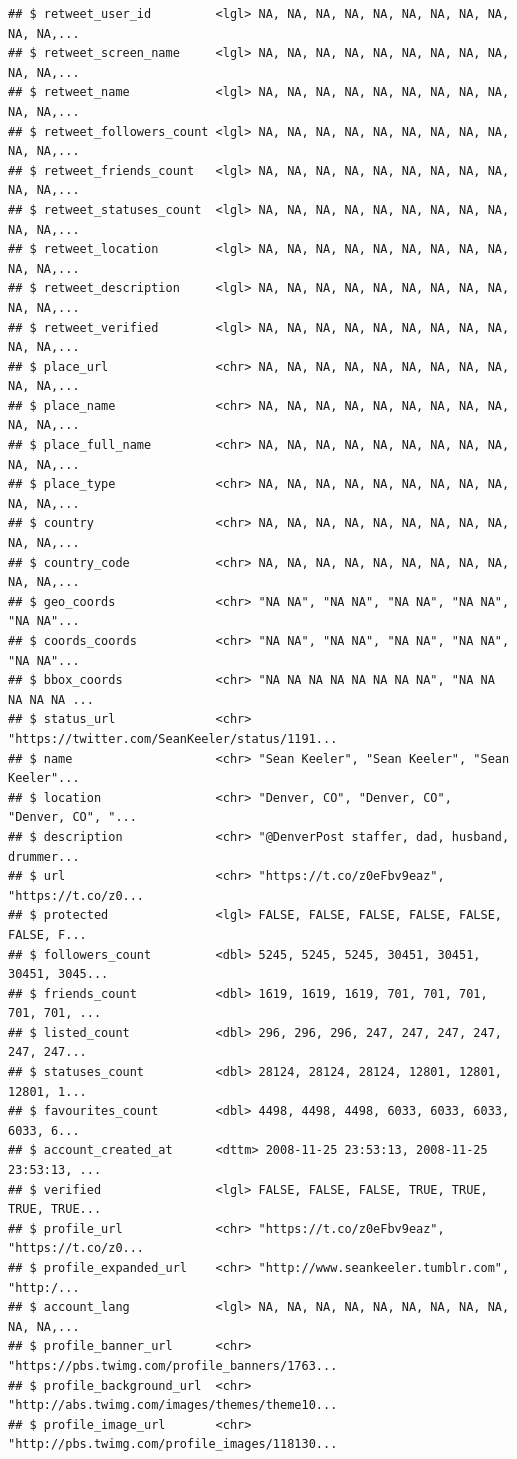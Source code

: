 \documentclass[
]{book}
\begin{document}
\begin{verbatim}
## $ retweet_user_id         <lgl> NA, NA, NA, NA, NA, NA, NA, NA, NA, NA, NA,...
## $ retweet_screen_name     <lgl> NA, NA, NA, NA, NA, NA, NA, NA, NA, NA, NA,...
## $ retweet_name            <lgl> NA, NA, NA, NA, NA, NA, NA, NA, NA, NA, NA,...
## $ retweet_followers_count <lgl> NA, NA, NA, NA, NA, NA, NA, NA, NA, NA, NA,...
## $ retweet_friends_count   <lgl> NA, NA, NA, NA, NA, NA, NA, NA, NA, NA, NA,...
## $ retweet_statuses_count  <lgl> NA, NA, NA, NA, NA, NA, NA, NA, NA, NA, NA,...
## $ retweet_location        <lgl> NA, NA, NA, NA, NA, NA, NA, NA, NA, NA, NA,...
## $ retweet_description     <lgl> NA, NA, NA, NA, NA, NA, NA, NA, NA, NA, NA,...
## $ retweet_verified        <lgl> NA, NA, NA, NA, NA, NA, NA, NA, NA, NA, NA,...
## $ place_url               <chr> NA, NA, NA, NA, NA, NA, NA, NA, NA, NA, NA,...
## $ place_name              <chr> NA, NA, NA, NA, NA, NA, NA, NA, NA, NA, NA,...
## $ place_full_name         <chr> NA, NA, NA, NA, NA, NA, NA, NA, NA, NA, NA,...
## $ place_type              <chr> NA, NA, NA, NA, NA, NA, NA, NA, NA, NA, NA,...
## $ country                 <chr> NA, NA, NA, NA, NA, NA, NA, NA, NA, NA, NA,...
## $ country_code            <chr> NA, NA, NA, NA, NA, NA, NA, NA, NA, NA, NA,...
## $ geo_coords              <chr> "NA NA", "NA NA", "NA NA", "NA NA", "NA NA"...
## $ coords_coords           <chr> "NA NA", "NA NA", "NA NA", "NA NA", "NA NA"...
## $ bbox_coords             <chr> "NA NA NA NA NA NA NA NA", "NA NA NA NA NA ...
## $ status_url              <chr> "https://twitter.com/SeanKeeler/status/1191...
## $ name                    <chr> "Sean Keeler", "Sean Keeler", "Sean Keeler"...
## $ location                <chr> "Denver, CO", "Denver, CO", "Denver, CO", "...
## $ description             <chr> "@DenverPost staffer, dad, husband, drummer...
## $ url                     <chr> "https://t.co/z0eFbv9eaz", "https://t.co/z0...
## $ protected               <lgl> FALSE, FALSE, FALSE, FALSE, FALSE, FALSE, F...
## $ followers_count         <dbl> 5245, 5245, 5245, 30451, 30451, 30451, 3045...
## $ friends_count           <dbl> 1619, 1619, 1619, 701, 701, 701, 701, 701, ...
## $ listed_count            <dbl> 296, 296, 296, 247, 247, 247, 247, 247, 247...
## $ statuses_count          <dbl> 28124, 28124, 28124, 12801, 12801, 12801, 1...
## $ favourites_count        <dbl> 4498, 4498, 4498, 6033, 6033, 6033, 6033, 6...
## $ account_created_at      <dttm> 2008-11-25 23:53:13, 2008-11-25 23:53:13, ...
## $ verified                <lgl> FALSE, FALSE, FALSE, TRUE, TRUE, TRUE, TRUE...
## $ profile_url             <chr> "https://t.co/z0eFbv9eaz", "https://t.co/z0...
## $ profile_expanded_url    <chr> "http://www.seankeeler.tumblr.com", "http:/...
## $ account_lang            <lgl> NA, NA, NA, NA, NA, NA, NA, NA, NA, NA, NA,...
## $ profile_banner_url      <chr> "https://pbs.twimg.com/profile_banners/1763...
## $ profile_background_url  <chr> "http://abs.twimg.com/images/themes/theme10...
## $ profile_image_url       <chr> "http://pbs.twimg.com/profile_images/118130...
\end{verbatim}
\end{document}
